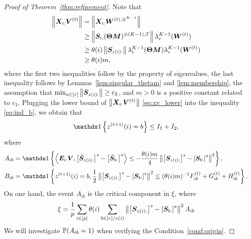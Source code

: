 \documentclass[lettersize,onecolumn,journal]{IEEEtran}
\theoremstyle{definition}
\theoremstyle{definition}
\newcommand{\off}[1]{\left[#1\right]}
\newcommand{\offf}[1]{\left\{#1\right\}}
\newcommand{\ang}[1]{\left\langle#1\right\rangle}
\begin{document}
\begin{proof}[Proof of Theorem~\ref{thm:refinement}]
   Note that 
    \begin{align}
        \onorm{\mX_{i:} \mV^{(t)}} &= \onorm{ \mX_{i:} \mW^{(t), \otimes^{K-1}}} \\
        &\geq \onorm{\mS_{i:} (\mTheta \mM)^{\otimes (K-1),T} } \lambda^{K-1}_r(\mW^{(t)}) \\
        & \geq \theta(i) \onorm{\mS_{z(i):}} \lambda_r^{K-1}(\mTheta \mM) \lambda^{K-1}_r(\mW^{(t)})\\
        & \geq\theta(i) m , \label{eq:xv_lower}
    \end{align}
    where the first two inequalities follow by the property of eigenvalues, the last inequality follows by Lemmas~\ref{lem:singular_thetam} and \ref{lem:membership}, the assumption that $\min_{a \in [r]} \left\lVert\bm S_{z(i):}\right\rVert \geq c_3$, and $m >0$ is a positive constant related to $ c_3$. Plugging the lower bound of $ \left\lVert\bm X_{i:} \bm{V}^{(t)}\right\rVert$ \eqref{eq:xv_lower} into the inequality \ref{eq:ind_b}, we obtain that 
    \begin{equation}\label{eq:decomp1}
        \ind \offf{ z^{(t+1)}(i) = b  } \leq I_1 + I_2,
    \end{equation}
    where 
    \begin{align}
        A_{ib} &= \ind \offf{\ang{ \mE_{i:} \mV, \off{  \tilde \mS_{z(i):} }^s - \off{  \tilde \mS_{b:} }^s }  \leq - \frac{\theta(i) m}{4} \onorm{ \off{ \mS_{z(i):}  }^s - \off{ \mS_{b:}  }^s  }^2 },\\
        B_{ib} &= \ind \offf{z^{(t+1)}(i) = b, \frac{1}{2}\onorm{ \off{ \mS_{z(i):}  }^s - \off{ \mS_{b:}  }^s  }^2 \leq (\theta(i) m)^{-1} F_{ib}^{(t)} + G_{ib}^{(t)} + H_{ib}^{(t)} }.
    \end{align}
    On one hand, the event $A_{ib}$ is the critical component in $\xi$, where
    \begin{equation}
        \xi =   \frac{1}{p} \sum_{i \in [p] } \theta(i) \sum_{b \in [r]/z(i)}  \onorm{ \off{ \mS_{ z(i):}  }^s - \off{ \mS_{b:}  }^s  }^2 A_{ib}
    \end{equation}
    We will investigate $\mathbb{P}(A_{ib} = 1)$ when verifying the Condition~\ref{cond:origin}. 
    

\end{proof}
\end{document}
